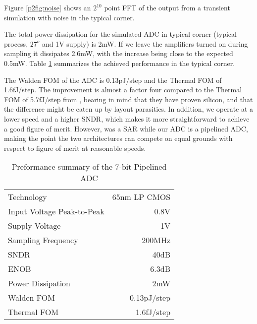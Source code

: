 Figure \ref{p2fig:noise} shows an $2^{10}$ point FFT of the output from
a transient simulation with noise in the typical corner.  


The total power dissipation for the simulated ADC in typical corner
(typical process, $27^o$ and 1V supply) is 2mW. If we leave the
amplifiers turned on during sampling it dissipates 2.6mW, with the increase being close
to the expected 0.5mW. Table
\ref{p2tab:performance} summarizes the achieved performance in the
typical corner.

The
Walden FOM of the ADC is 0.13pJ/step and the  Thermal FOM of
1.6fJ/step. 
The improvement is almost a factor four compared to the Thermal FOM of
5.7fJ/step from \cite{Chen06}, bearing in mind that they have proven
silicon, and that the difference might be eaten up by layout
parasitics. In addition, we operate at a lower speed and a higher SNDR,
which makes it more straightforward to achieve a good figure of merit. However, \cite{Chen06} was a SAR while our ADC is
a pipelined ADC, making the point the two architectures can compete on
equal grounds with respect to figure of merit at reasonable speeds.


 
\begin{table}[ht]
\centering 
\caption{Preformance summary of the 7-bit Pipelined ADC}
\begin{tabular}{l|r}
\label{p2tab:performance}
Technology & 65nm LP CMOS\\
Input Voltage Peak-to-Peak & 0.8V\\
Supply Voltage & 1V \\
Sampling Frequency & 200MHz\\
SNDR & 40dB \\
ENOB & 6.3dB \\
Power Dissipation & 2mW \\
Walden FOM & 0.13pJ/step\\
Thermal FOM & 1.6fJ/step\\
\end{tabular}

\end{table}

